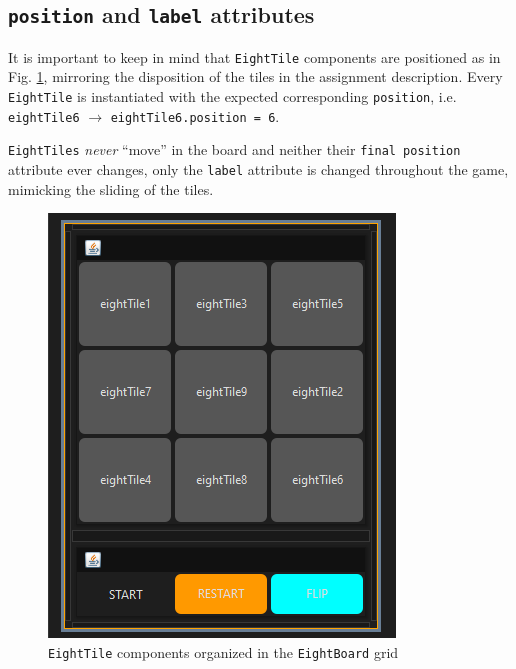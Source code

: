 \subsection{\texttt{position} and \texttt{label} attributes}
\begin{paracol}{2}
   \colfill
   It is important to keep in mind that \lstinline|EightTile| components are positioned as in Fig. \ref{fig:netBeans_board}, mirroring the disposition of the tiles in the assignment description.
   Every \lstinline|EightTile| is instantiated with the expected corresponding \lstinline|position|, i.e. \lstinline|eightTile6| $ \rightarrow $ \lstinline|eightTile6.position = 6|.

   \lstinline|EightTiles| \textit{never} ``move'' in the board and neither their \lstinline|final position| attribute ever changes, only the \lstinline|label| attribute is changed throughout the game, mimicking the sliding of the tiles.

   \colfill
   
   
   \switchcolumn
   \begin{figure}[htbp]
      \centering
      \includegraphics{images/netBeans_board.png}
      \caption{\lstinline|EightTile| components organized in the \lstinline|EightBoard| grid}
      \label{fig:netBeans_board}
   \end{figure}
\end{paracol}

